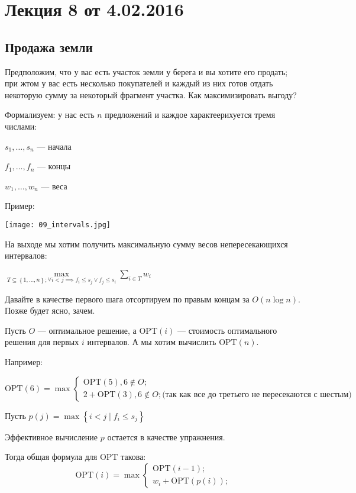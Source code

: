 
\let\epsilent\varepsilon


\section*{Лекция 8 от 4.02.2016}

\subsection{Продажа земли}

Предположим, что у вас есть участок земли у берега и вы хотите его продать; при жтом у вас есть несколько покупателей и каждый из них готов отдать некоторую сумму за некоторый фрагмент участка. Как максимизировать выгоду?

Формализуем: у нас есть $n$ предложений и каждое характеерихуется тремя числами:

$s_1, \ldots, s_n$ --- начала

$f_1, \ldots, f_n$ --- концы

$w_1, \ldots, w_n$ --- веса

Пример:

\texttt{[image: 09\_intervals.jpg]}

На выходе мы хотим получить максимальную сумму весов непересекающихся интервалов:

$\max\limits_{T\subseteq \left\{ 1,\ldots, n \right\}; \forall i<j \implies f_i \leqslant s_j \lor f_j \leqslant s_i} \sum\limits_{i\in T}w_i$

Давайте в качестве первого шага отсортируем по правым концам за $O(n\log n)$. Позже будет ясно, зачем.

Пусть $O$ --- оптимальное решение, а OPT$(i)$ --- стоимость оптимального решения для первых $i$ интервалов. А мы хотим вычислить OPT$(n)$.

Например:

\[
    \mathrm{OPT}(6) = \max\begin{cases}
        \mathrm{OPT}(5), 6\not\in O;\\
        2+ \mathrm{OPT}(3), 6\not\in O; \text{(так как все до третьего не пересекаются с шестым)}
    \end{cases}
\]

Пусть $p(j) = \max\left\{ i<j \mid f_{i}\leqslant s_j\right\}$

Эффективное вычисление $p$ остается в качестве упражнения.

Тогда общая формула для OPT такова:
\[
    \mathrm{OPT}(i) = \max\begin{cases}
        \mathrm{OPT}(i-1);\\
        w_i+ \mathrm{OPT}(p(i));
    \end{cases}
\]

